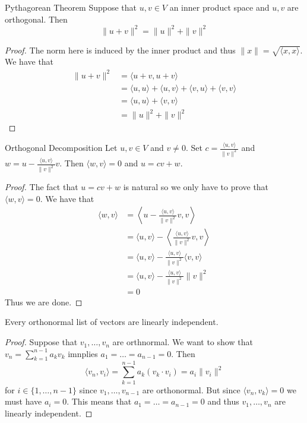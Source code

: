 \documentclass[a4paper]{article}
\begin{document}
\begin{thm}{Pythagorean Theorem}{} Suppose that $u,v\in V$ an inner product space and $u,v$ are orthogonal. Then $$\|u+v\|^2=\|u\|^2+\|v\|^2$$ \tcbline
\begin{proof}
The norm here is induced by the inner product and thus $\|x\|=\sqrt{\langle x,x\rangle}$. We have that 
\begin{align*}
\|u+v\|^2&=\langle u+v,u+v\rangle\\
&=\langle u,u\rangle+\langle u,v\rangle+\langle v,u\rangle+\langle v,v\rangle\\
&=\langle u,u\rangle+\langle v,v\rangle\\
&=\|u\|^2+\|v\|^2
\end{align*}
\end{proof}
\end{thm}

\begin{thm}{Orthogonal Decomposition}{} Let $u,v\in V$ and $v\neq 0$. Set $c=\frac{\langle u,v\rangle}{\|v\|^2}$ and $w=u-\frac{\langle u,v\rangle}{\|v\|^2}v$. Then $\langle w,v\rangle=0$ and $u=cv+w$. \tcbline
\begin{proof}
The fact that $u=cv+w$ is natural so we only have to prove that $\langle w,v\rangle=0$. We have that 
\begin{align*}
\langle w,v\rangle&=\left\langle u-\frac{\langle u,v\rangle}{\|v\|^2}v,v\right\rangle\\
&=\langle u,v\rangle-\left\langle \frac{\langle u,v\rangle}{\|v\|^2}v,v\right\rangle\\
&=\langle u,v\rangle-\frac{\langle u,v\rangle}{\|v\|^2}\langle v,v\rangle\\
&=\langle u,v\rangle-\frac{\langle u,v\rangle}{\|v\|^2}\|v\|^2\\
&=0
\end{align*}
Thus we are done. 
\end{proof}
\end{thm}

\begin{prp}{}{} Every orthonormal list of vectors are linearly independent. \tcbline
\begin{proof}
Suppose that $v_1,\dots,v_n$ are orthnormal. We want to show that $v_n=\sum_{k=1}^{n-1}a_kv_k$ imnplies $a_1=\dots=a_{n-1}=0$. Then $$\langle v_n, v_i\rangle=\sum_{k=1}^{n-1}a_k(v_k\cdot v_i)=a_i\|v_i\|^2$$ for $i\in\{1,\dots,n-1\}$ since $v_1,\dots,v_{n-1}$ are orthonormal. But since $\langle v_n, v_k\rangle=0$ we must have $a_i=0$. This means that $a_1=\dots=a_{n-1}=0$ and thus $v_1,\dots,v_n$ are linearly independent. 
\end{proof}
\end{prp}
\end{document}
